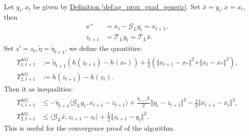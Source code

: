 \documentclass[12pt]{article}
\begin{document}
    \begin{remark}\label{remark:upsilon-upperbound-for-iterates}
        Let $y_t, x_t$ be given by
        \hyperref[def:ag_prox_grad_generic]
        {Definition \ref*{def:ag_prox_grad_generic}}.
        Set $\bar x = y_t, x = x_t$, then 
        \begin{align*}
            x^+ &= x_t - \mathcal G_L y_t = x_{t + 1},
            \\
            z_{t + 1} &= \mathcal T_L y_t = \mathcal T_L \bar x.
        \end{align*}
        Set $z' = z_t, \tilde \eta = \tilde \eta_{t + 1}$, we define the quantities: 
        \begin{align*}
            \Upsilon_{1, t + 1}^{\text{AG}}
            &:= 
            \tilde \eta_{t + 1}(h(z_{t + 1}) - h(x_*))
            + 
            \frac{1}{2}(\Vert x_{t + 1} - x_*\Vert^2 + \Vert x_t - x_*\Vert^2),
            \\
            \Upsilon_{2, t + 1}^{\text{AG}}
            &:= 
            h(z_{t + 1}) - h(z_t). 
        \end{align*}
        Then it as inequalities: 
        \begin{align*}
            \Upsilon_{1, t + 1}^{\text{AG}}
            &\le 
            - \tilde \eta_{t + 1}\langle \mathcal G_L y_t, x_{t + 1} - z_{t + 1}\rangle
            + 
            \frac{\tilde \eta_{t + 1}L}{2}
            \Vert  
                y_t - z_{t + 1}
            \Vert^2
            - 
            \frac{1}{2}
            \Vert x_{t + 1} - x_t\Vert^2,  
            \\ 
            \Upsilon_{2, t + 1}^{\text{AG}}
            &\le 
            \langle \mathcal G_L \bar x, z_{t + 1} - z_t \rangle + 
            \frac{L}{2}\Vert z_{t + 1} - y_t\Vert^2.
        \end{align*}
        This is useful for the convergence proof of the algorithm. 
    \end{remark}
\end{document}
